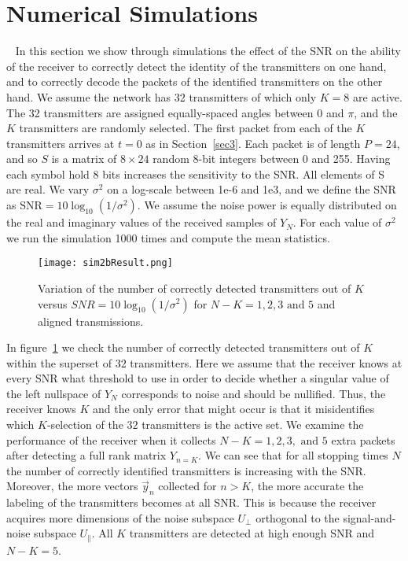 \documentclass[10pt, a4paper, twocolumn]{IEEEtran}
\begin{document}
\section{Numerical Simulations}~\label{sec8}
In this section we show through simulations the effect of the SNR on the ability of the receiver to correctly detect the identity of the transmitters on one hand, and to correctly decode the packets of the identified transmitters on the other hand. We assume the network has 32 transmitters of which only $K=8$ are active. The 32 transmitters are assigned equally-spaced angles between $0$ and $\pi$, and the $K$ transmitters are randomly selected. The first packet from each of the $K$ transmitters arrives at $t=0$ as in Section~\ref{sec3}. Each packet is of length $P=24$, and so $S$ is a matrix of $8\times 24$ random 8-bit integers between 0 and 255. Having each symbol hold 8 bits increases the sensitivity to the SNR. All elements of S are real. We vary $\sigma^2$ on a log-scale between 1e-6 and 1e3, and we define the SNR as $\text{SNR} = 10\log_{10}(1/\sigma^2)$. We assume the noise power is equally distributed on the real and imaginary values of the received samples of $Y_N$. For each value of $\sigma^2$ we run the simulation 1000 times and compute the mean statistics.\\

\begin{figure}[ht]
\begin{center} 
\texttt{[image: sim2bResult.png]}
\caption{Variation of the number of correctly detected transmitters out of $K$ versus $SNR = 10\log_{10}(1/\sigma^2)$ for $N-K=1,2,3 \text{ and }5$ and aligned transmissions.}
\label{fig1}
\end{center}
\end{figure} 

\noindent In figure~\ref{fig1} we check the number of correctly detected transmitters out of $K$ within the superset of $32$ transmitters. Here we assume that the receiver knows at every SNR what threshold to use in order to decide whether a singular value of the left nullspace of $Y_N$ corresponds to noise and should be nullified. Thus, the receiver knows $K$ and the only error that might occur is that it misidentifies which $K$-selection of the $32$ transmitters is the active set. We examine the performance of the receiver when it collects $N - K = 1, 2, 3, \text{ and }5$ extra packets after detecting a full rank matrix $Y_{n = K}$. We can see that for all stopping times $N$ the number of correctly identified transmitters is increasing with the SNR. Moreover, the more vectors $\overrightarrow{y}_n$ collected for $n>K$, the more accurate the labeling of the transmitters becomes at all SNR. This is because the receiver acquires more dimensions of the noise subspace $U_{\bot}$ orthogonal to the signal-and-noise subspace $U_{\parallel}$. All $K$ transmitters are detected at high enough SNR and $N-K = 5$.
\end{document}
